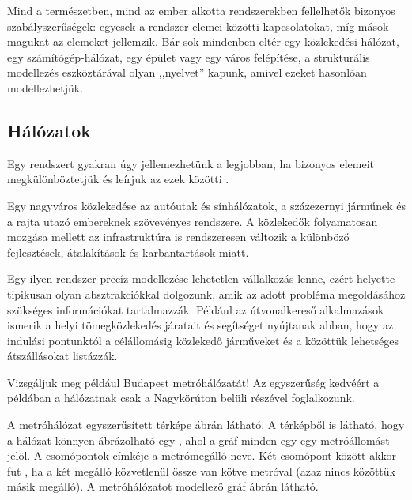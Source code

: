 Mind a természetben, mind az ember alkotta rendszerekben fellelhetők bizonyos szabályszerűségek: egyesek a rendszer elemei közötti kapcsolatokat, míg mások magukat az elemeket jellemzik. Bár sok mindenben eltér egy közlekedési hálózat, egy számítógép-hálózat, egy épület vagy egy város felépítése, a strukturális modellezés eszköztárával olyan ,,nyelvet'' kapunk, amivel ezeket hasonlóan modellezhetjük.

\subsection{Hálózatok}
\label{sec:halozatok}

Egy rendszert gyakran úgy jellemezhetünk a legjobban, ha bizonyos elemeit megkülönböztetjük és leírjuk az ezek közötti .

\begin{pelda}
	Egy nagyváros közlekedése az autóutak és sínhálózatok, a százezernyi járműnek és a rajta utazó embereknek szövevényes rendszere. A közlekedők folyamatosan mozgása mellett az infrastruktúra is rendszeresen változik a különböző fejlesztések, átalakítások és karbantartások miatt.

	Egy ilyen rendszer precíz modellezése lehetetlen vállalkozás lenne, ezért helyette tipikusan olyan absztrakciókkal dolgozunk, amik az adott probléma megoldásához szükséges információkat tartalmazzák. Például az útvonalkereső alkalmazások ismerik a helyi tömegközlekedés járatait és segítséget nyújtanak abban, hogy az indulási pontunktól a célállomásig közlekedő járműveket és a közöttük lehetséges átszállásokat listázzák.

	Vizsgáljuk meg például Budapest metróhálózatát! Az egyszerűség kedvéért a példában a hálózatnak csak a Nagykörúton belüli részével foglalkozunk.
\end{pelda}

A metróhálózat egyszerűsített térképe  ábrán látható. A térképből is látható, hogy a hálózat könnyen ábrázolható egy , ahol a gráf minden  egy-egy metróállomást jelöl. A csomópontok címkéje a metrómegálló neve. Két csomópont között akkor fut , ha a két megálló közvetlenül össze van kötve metróval (azaz nincs közöttük másik megálló). A metróhálózatot modellező %
gráf  ábrán látható.

